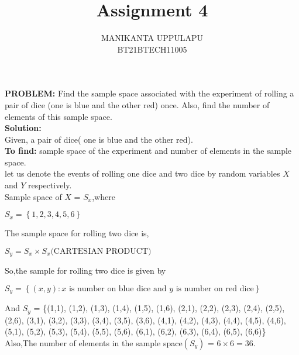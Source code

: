 \documentclass[journal,12pt,twocolumn]{IEEEtran}
\title{Assignment 4}
\author{MANIKANTA UPPULAPU\\BT21BTECH11005}
\date{}
\providecommand{\cbrak}[1]{\ensuremath{\left\{#1\right\}}}
\newcommand{\PROBLEM}{\noindent \textbf{PROBLEM: }}
\newcommand{\solution}{\noindent \textbf{Solution: }}
\newcommand{\tofind}{\noindent \textbf{To find: }}
\begin{document}
\maketitle
\PROBLEM Find the sample space associated with the experiment of rolling a pair of dice (one is blue and the other red) once. Also, find the number of elements of this sample space.\\

\solution \\
Given, a pair of dice( one is blue and the other red).\\

\tofind sample space of the experiment and number of elements in the sample space.\\

let us denote the events of rolling one dice and two dice by random variables $X$ and $Y$ respectively.\\
Sample space of $X$ = $S_x$,where\\
\begin{enumerate}[label=(\roman{enumi})]
	$S_x = \cbrak{1,2,3,4,5,6}$\\
\end{enumerate}
The sample space for rolling two dice is,\\
\begin{enumerate}[label=(\roman{enumi})]
	$S_y = S_x \times S_x \text{(CARTESIAN PRODUCT)}$
\end{enumerate}
So,the sample for rolling two dice is given by\\
\begin{enumerate}[label=(\roman{enumi})]
$S_y = \cbrak {(x,y) : x \text{ is number on blue dice and $y$ is number on red dice} }$\\
\end{enumerate}
And $S_y$ = \{(1,1), (1,2), (1,3), (1,4), (1,5), (1,6), (2,1), (2,2), (2,3), (2,4), (2,5), (2,6), (3,1), (3,2), (3,3), (3,4), (3,5), (3,6), (4,1), (4,2), (4,3), (4,4), (4,5), (4,6), (5,1), (5,2), (5,3), (5,4), (5,5), (5,6), (6,1), (6,2), (6,3), (6,4), (6,5), (6,6)\}\\

Also,The number of elements in the sample space$(S_y)$ = $6 \times 6 = 36.$
\end{document}
